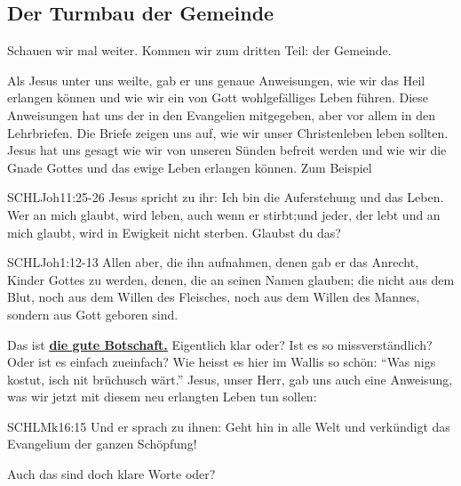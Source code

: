\documentclass[14pt]{../../inc/mybib}
\newenvironment{block}[1][]{%
  \vspace{1.5em}%
  \noindent\textbf{#1}\par%
  \vspace{0.0em}%
}{%
  \vspace{1em}%
}
\begin{document}
    \subsection{Der Turmbau der Gemeinde}
    Schauen wir mal weiter. Kommen wir zum dritten Teil:  der Gemeinde.
    \begin{block}
    Als Jesus unter uns weilte, gab er uns genaue Anweisungen, wie wir das Heil erlangen können und wie wir ein von Gott wohlgefälliges Leben führen. Diese Anweisungen hat uns der \herr{} in den Evangelien mitgegeben, aber vor allem in den Lehrbriefen. Die Briefe zeigen uns auf, wie wir unser Christenleben leben sollten.
    Jesus hat uns gesagt wie wir von unseren Sünden befreit werden und wie wir die Gnade Gottes und das ewige Leben erlangen können. Zum Beispiel
    \begin{bibelbox}{SCHL}{Joh}{11:25-26}
        Jesus spricht zu ihr: Ich bin die Auferstehung und das Leben. Wer an mich glaubt, wird leben, auch wenn er stirbt;und jeder, der lebt und an mich glaubt, wird in Ewigkeit nicht sterben. Glaubst du das?
    \end{bibelbox} 
    \begin{bibelbox}{SCHL}{Joh}{1:12-13}
        Allen aber, die ihn aufnahmen, denen gab er das Anrecht, Kinder Gottes zu werden, denen, die an seinen Namen glauben;
        die nicht aus dem Blut, noch aus dem Willen des Fleisches, noch aus dem Willen des Mannes, sondern aus Gott geboren sind.
    \end{bibelbox} 
    Das ist \textbf{\underline{die gute Botschaft.}}
    Eigentlich klar oder? Ist es so missverständlich? Oder ist es einfach zueinfach? Wie heisst es hier im Wallis so schön: \enquote{Was nigs kostut, isch nit brüchusch wärt.} Jesus, unser Herr, gab uns auch eine Anweisung, was wir jetzt mit diesem neu erlangten Leben tun sollen:
    \begin{bibelbox}{SCHL}{Mk}{16:15}
        Und er sprach zu ihnen: Geht hin in alle Welt und verkündigt das Evangelium der ganzen Schöpfung!
    \end{bibelbox} 
    Auch das sind doch klare Worte oder?
\end{block}
\end{document}

